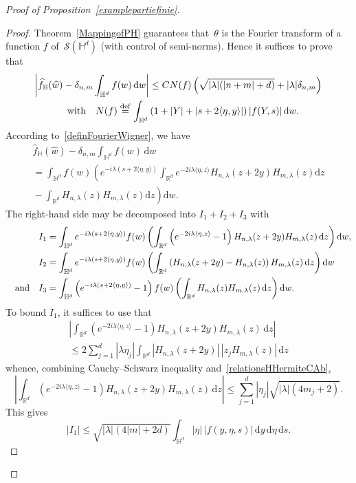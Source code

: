 \documentclass[11pt]{article}
\theoremstyle{definition}
\numberwithin{equation}{section}
\numberwithin{figure}{section}
\numberwithin{table}{section}
\newcommand{\lam}{\lambda}
\newcommand{\wh}{\widehat}
\newcommand*\cS{\mathcal{S}}
\newcommand*\R{\mathbb{R}}
\newcommand*\bbH{\mathbb{H}}
\newcommand{\andf}{\quad\hbox{and}\quad}
\newcommand{\with}{\quad\hbox{with}\quad}
\newcommand*\eqdefa{\overset{\mathrm{def}}{=}}
\newcommand*{\dd}{\mathrm{d}}
\newcommand{\ds}{\dd s}
\newcommand{\dw}{\dd w}
\newcommand{\dy}{\dd y}
\newcommand{\dz}{\dd z}
\newcommand{\deta}{\dd \eta}
\begin{document}
\begin{proof}[Proof of Proposition~\ref{examplepartiefinie}]
\begin{proof}
Theorem~\ref{MappingofPH} guarantees that~$\theta$ is the Fourier transform of a function $f$ of~$\cS(\bbH^d)$ (with control of semi-norms). Hence it suffices to prove that
\begin{multline*}
\left|\wh f_\bbH(\wh w)-\delta_{n,m}\int_{\bbH^d} f(w)\,\dw\right| \leq CN(f) \left(\sqrt{|\lam|(|n+m|+d)}+|\lam|\delta_{n,m}\right)\\
\with N(f)\eqdefa \int_{\bbH^d} \left(1+|Y| +|s+2\langle \eta,y\rangle|\right) |f(Y,s)| \,\dw.
\end{multline*}
According to~\eqref{definFourierWigner}, we have
\begin{multline*}
\wh f_\bbH(\wh w)-\delta_{n,m}\int_{\bbH^d} f(w)\,\dw \\ =\int_{\bbH^d} \! f(w)\left(e^{-i\lam(s\!+\!2\langle\eta,y\rangle)}\!\!
\int_{\R^d}\!e^{-2i\lam\langle\eta,z\rangle} H_{n,\lam}(z\!+\!2y)H_{m,\lam}(z)\dz\right.\\
\left.{}-\int_{\R^d}H_{n,\lam}(z) H_{m,\lam}(z)\dz\!\right)\dw.
\end{multline*}
The right-hand side may be decomposed into $I_1+I_2+I_3$ with
\[
\begin{aligned}
I_1&=\int_{\bbH^d} e^{-i\lam(s+2\langle\eta,y\rangle)}f(w)
\left(\int_{\R^d} \left(e^{-2i\lam\langle\eta,z\rangle}-1\right)H_{n,\lam}(z+2y)H_{m,\lam}(z)\,\dz\right)\dw,\\
I_2&=\int_{\bbH^d} e^{-i\lam(s+2\langle\eta,y\rangle)}f(w)
\left(\int_{\R^d} \left(H_{n,\lam}(z+2y)-H_{n,\lam}(z)\right)H_{m,\lam}(z)\,\dz\right)\dw\\
\andf I_3&=\int_{\bbH^d} \left(e^{-i\lam(s+2\langle\eta,y\rangle)}-1\right)f(w)\left(\int_{\R^d} H_{n,\lam}(z)H_{m,\lam}(z)\,\dz\right)\dw.
\end{aligned}
\]
To bound $I_1$, it suffices to use that
\begin{multline*}
\left|\int_{\R^d} \left(e^{-2i\lam\langle\eta,z\rangle}-1\right)H_{n,\lam}(z\!+\!2y)H_{m,\lam}(z)\,\dz\right|\\
\leq 2\sum_{j=1}^d |\lam\eta_j| \int_{\R^d} |H_{n,\lam}(z\!+\!2y)|\,|z_j H_{m,\lam}(z)|\,\dz
\end{multline*}
whence, combining Cauchy--Schwarz inequality and~\eqref{relationsHHermiteCAb},
\[
\left|\int_{\R^d} \left(e^{-2i\lam\langle\eta,z\rangle}-1\right)H_{n,\lam}(z+2y)H_{m,\lam}(z)\,\dz\right|
\leq \sum_{j=1}^d |\eta_j| \sqrt{|\lam|(4m_j+2)}.
\]
This gives
\begin{equation}\label{eq:I1}
|I_1|\leq \sqrt{|\lam|(4|m|+2d)}\int_{\bbH^d} |\eta|\,|f(y,\eta,s)|\,\dy\,\deta\,\ds.

\end{equation}
\end{proof}
\end{proof}
\end{document}
